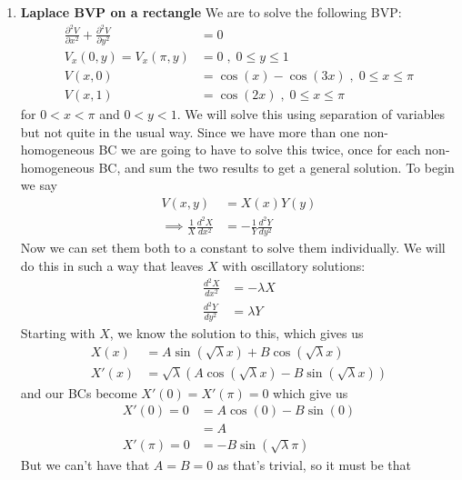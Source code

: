 \documentclass[12pt]{article}
\begin{document}
\begin{enumerate}
        \item \textbf{Laplace BVP on a rectangle}\newline
        We are to solve the following BVP:
        \begin{align*}
            \frac{\partial^2 V}{\partial x^2}+\frac{\partial ^2 V}{\partial y^2}&=0\\
            V_x(0,y)=V_x(\pi,y)&=0\;,\;0\leq y\leq1\\
            V(x,0)&=\cos(x)-\cos(3x)\;,\;0\leq x\leq\pi\\
            V(x,1)&=\cos(2x)\;,\;0\leq x\leq\pi
        \end{align*}
        for $0<x<\pi$ and $0<y<1$. We will solve this using separation of variables but not quite in the 
        usual way. Since we have more than one non-homogeneous BC we are going to have to solve this twice, 
        once for each non-homogeneous BC, and sum the two results to get a general solution.\newline
        To begin we say 
        \begin{align*}
            V(x,y)&=X(x)Y(y)\\
            \implies \frac{1}{X}\frac{d^2 X}{dx^2}&=-\frac{1}{Y}\frac{d^2 Y}{dy^2}
        \end{align*}
        Now we can set them both to a constant to solve them individually. We will do this in such a way 
        that leaves $X$ with oscillatory solutions:
        \begin{align*}
            \frac{d^2 X}{dx^2}&=-\lambda X\\
            \frac{d^2 Y}{dy^2}&=\lambda Y
        \end{align*}
        Starting with $X$, we know the solution to this, which gives us
        \begin{align*}
            X(x)&=A\sin(\sqrt{\lambda}x)+B\cos(\sqrt{\lambda}x)\\
            X'(x)&=\sqrt{\lambda}(A\cos(\sqrt{\lambda}x)-B\sin(\sqrt{\lambda}x))
        \end{align*}
        and our BCs become $X'(0)=X'(\pi)=0$ which give us
        \begin{align*}
            X'(0)=0&=A\cos(0)-B\sin(0)\\
            &=A\\
            X'(\pi)=0&=-B\sin(\sqrt{\lambda}\pi)
        \end{align*}
        But we can't have that $A=B=0$ as that's trivial, so it must be that 
        \begin{align*}

\end{align*}
\end{enumerate}
\end{document}
